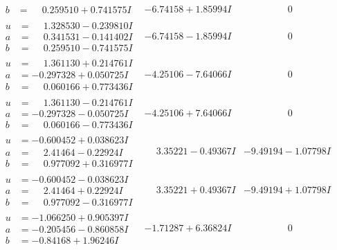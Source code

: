 \documentclass[1p]{elsarticle_modified}
\theoremstyle{definition}
\begin{document}
$$\begin{array}{c|c|c}
\begin{aligned}
b &= \phantom{-}0.259510 + 0.741575 I\end{aligned}
 & -6.74158 + 1.85994 I & \phantom{-0.000000 } 0 \\ \hline\begin{aligned}
u &= \phantom{-}1.328530 - 0.239810 I \\
a &= \phantom{-}0.341531 - 0.141402 I \\
b &= \phantom{-}0.259510 - 0.741575 I\end{aligned}
 & -6.74158 - 1.85994 I & \phantom{-0.000000 } 0 \\ \hline\begin{aligned}
u &= \phantom{-}1.361130 + 0.214761 I \\
a &= -0.297328 + 0.050725 I \\
b &= \phantom{-}0.060166 + 0.773436 I\end{aligned}
 & -4.25106 - 7.64066 I & \phantom{-0.000000 } 0 \\ \hline\begin{aligned}
u &= \phantom{-}1.361130 - 0.214761 I \\
a &= -0.297328 - 0.050725 I \\
b &= \phantom{-}0.060166 - 0.773436 I\end{aligned}
 & -4.25106 + 7.64066 I & \phantom{-0.000000 } 0 \\ \hline\begin{aligned}
u &= -0.600452 + 0.038623 I \\
a &= \phantom{-}2.41464 - 0.22924 I \\
b &= \phantom{-}0.977092 + 0.316977 I\end{aligned}
 & \phantom{-}3.35221 - 0.49367 I & -9.49194 - 1.07798 I \\ \hline\begin{aligned}
u &= -0.600452 - 0.038623 I \\
a &= \phantom{-}2.41464 + 0.22924 I \\
b &= \phantom{-}0.977092 - 0.316977 I\end{aligned}
 & \phantom{-}3.35221 + 0.49367 I & -9.49194 + 1.07798 I \\ \hline\begin{aligned}
u &= -1.066250 + 0.905397 I \\
a &= -0.205456 - 0.860858 I \\
b &= -0.84168 + 1.96246 I\end{aligned}
 & -1.71287 + 6.36824 I & \phantom{-0.000000 } 0 \\ \hline\begin{aligned}

\end{aligned}
\end{array}$$
\end{document}
